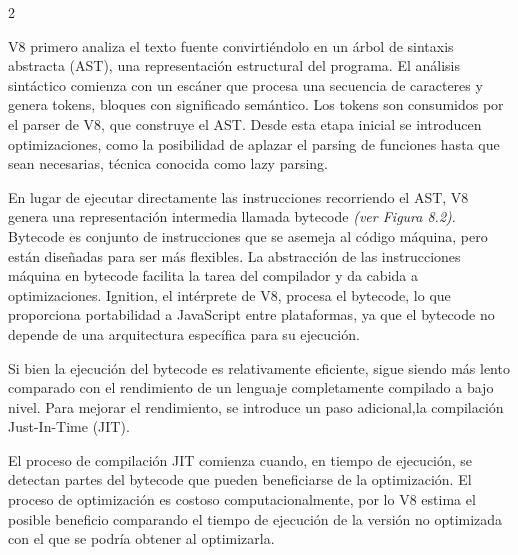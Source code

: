 \documentclass[12pt,spanish,Letterpaper,openany]{book}
\begin{document}
\begin {multicols}{2}
\begin {flushleft}
\begin{minipage}[c]{\columnwidth}
\end{minipage}
\end {flushleft}

V8 primero analiza el texto fuente convirtiéndolo en un árbol de sintaxis abstracta (AST), una representación estructural del programa. El análisis sintáctico comienza con un escáner que procesa una secuencia de caracteres y genera tokens, bloques con significado semántico. Los tokens son consumidos por el parser de V8, que construye el AST. Desde esta etapa inicial se introducen optimizaciones, como la posibilidad de aplazar el parsing de funciones hasta que sean necesarias, técnica conocida como lazy parsing.

En lugar de ejecutar directamente las instrucciones recorriendo el AST, V8 genera una representación intermedia llamada bytecode \emph{(ver Figura 8.2)}. Bytecode es conjunto de instrucciones que se asemeja al código máquina, pero están diseñadas para ser más flexibles.
La abstracción de las instrucciones máquina en bytecode facilita la tarea del compilador y da cabida a optimizaciones. Ignition, el intérprete de V8, procesa el bytecode, lo que proporciona portabilidad a JavaScript entre plataformas, ya que el bytecode no depende de una arquitectura específica para su ejecución.

Si bien la ejecución del bytecode es relativamente eficiente, sigue siendo más lento comparado con el rendimiento de un lenguaje completamente compilado a bajo nivel. Para mejorar el rendimiento, se introduce un paso adicional,la compilación Just-In-Time (JIT).

El proceso de compilación JIT comienza cuando, en tiempo de ejecución, se detectan partes del bytecode que pueden beneficiarse de la optimización. El proceso de optimización es costoso computacionalmente, por lo V8 estima el posible beneficio comparando el tiempo de ejecución de la versión no optimizada con el que se podría obtener al optimizarla.

\begin {flushleft}
\noindent\begin{minipage}[c]{\columnwidth}


\end{minipage}
\end{flushleft}
\end{multicols}
\end{document}
